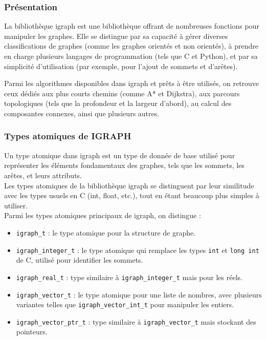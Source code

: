 \documentclass[10pt]{article}
\begin{document}
\subsubsection{Présentation}

La bibliothèque igraph est une bibliothèque offrant de nombreuses fonctions pour manipuler les graphes. Elle se distingue par sa capacité à gérer diverses classifications de graphes (comme les graphes orientés et non orientés), à prendre en charge plusieurs langages de programmation (tels que C et Python), et par sa simplicité d'utilisation (par exemple, pour l'ajout de sommets et d'arêtes).
 
Parmi les algorithmes disponibles dans igraph et prêts à être utilisés, on retrouve ceux dédiés aux plus courts chemins (comme A* et Dijkstra), aux parcours topologiques (tels que la profondeur et la largeur d'abord), au calcul des composantes connexes, ainsi que plusieurs autres.\\

\subsubsection{Types atomiques de IGRAPH}
Un type atomique dans igraph est un type de donnée de base utilisé pour représenter les éléments fondamentaux des graphes, tels que les sommets, les arêtes, et leurs attributs.\\
Les types atomiques de la bibliothèque igraph se distinguent par leur similitude avec les types usuels en C (int, float, etc.), tout en étant beaucoup plus simples à utiliser.\\
Parmi les types atomiques principaux de igraph, on distingue :

\begin{itemize}
    \item \texttt{igraph\_t} : le type atomique pour la structure de graphe.
    \item \texttt{igraph\_integer\_t} : le type atomique qui remplace les types \texttt{int} et \texttt{long int} de C, utilisé pour identifier les sommets.
    \item \texttt{igraph\_real\_t} : type similaire à \texttt{igraph\_integer\_t} mais pour les réels.
    \item \texttt{igraph\_vector\_t} : le type atomique pour une liste de nombres, avec plusieurs variantes telles que \texttt{igraph\_vector\_int\_t} pour manipuler les entiers.
    \item \texttt{igraph\_vector\_ptr\_t} : type similaire à \texttt{igraph\_vector\_t} mais stockant des pointeurs.
\end{itemize}
\end{document}
